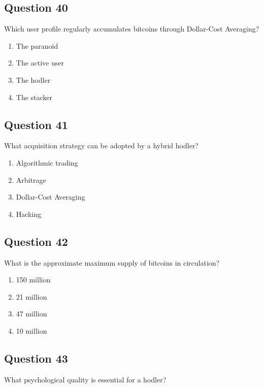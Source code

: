 \documentclass[12pt,a4paper]{article}
\begin{document}
\bigskip


\subsection*{Question 40}
Which user profile regularly accumulates bitcoins through Dollar-Cost Averaging?

\begin{enumerate}[label=\Alph*., leftmargin=*]
\item The paranoid
\item The active user
\item The hodler
\item The stacker
\end{enumerate}

\bigskip


\subsection*{Question 41}
What acquisition strategy can be adopted by a hybrid hodler?

\begin{enumerate}[label=\Alph*., leftmargin=*]
\item Algorithmic trading
\item Arbitrage
\item Dollar-Cost Averaging
\item Hacking
\end{enumerate}

\bigskip


\subsection*{Question 42}
What is the approximate maximum supply of bitcoins in circulation?

\begin{enumerate}[label=\Alph*., leftmargin=*]
\item 150 million
\item 21 million
\item 47 million
\item 10 million
\end{enumerate}

\bigskip


\subsection*{Question 43}
What psychological quality is essential for a hodler?
\end{document}
